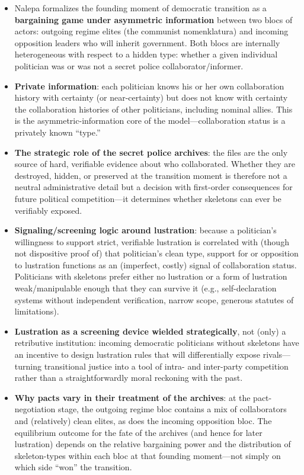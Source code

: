 \documentclass[12pt]{article}
\begin{document}
\begin{itemize}[leftmargin=*, itemsep=4pt]
    \item Nalepa formalizes the founding moment of democratic transition as a \textbf{bargaining game under asymmetric information} between two blocs of actors: outgoing regime elites (the communist nomenklatura) and incoming opposition leaders who will inherit government. Both blocs are internally heterogeneous with respect to a hidden type: whether a given individual politician was or was not a secret police collaborator/informer.
    \item \textbf{Private information}: each politician knows his or her own collaboration history with certainty (or near-certainty) but does not know with certainty the collaboration histories of other politicians, including nominal allies. This is the asymmetric-information core of the model---collaboration status is a privately known ``type.''
    \item \textbf{The strategic role of the secret police archives}: the files are the only source of hard, verifiable evidence about who collaborated. Whether they are destroyed, hidden, or preserved at the transition moment is therefore not a neutral administrative detail but a decision with first-order consequences for future political competition---it determines whether skeletons can ever be verifiably exposed.
    \item \textbf{Signaling/screening logic around lustration}: because a politician's willingness to support strict, verifiable lustration is correlated with (though not dispositive proof of) that politician's clean type, support for or opposition to lustration functions as an (imperfect, costly) signal of collaboration status. Politicians with skeletons prefer either no lustration or a form of lustration weak/manipulable enough that they can survive it (e.g., self-declaration systems without independent verification, narrow scope, generous statutes of limitations).
    \item \textbf{Lustration as a screening device wielded strategically}, not (only) a retributive institution: incoming democratic politicians without skeletons have an incentive to design lustration rules that will differentially expose rivals--- turning transitional justice into a tool of intra- and inter-party competition rather than a straightforwardly moral reckoning with the past.
    \item \textbf{Why pacts vary in their treatment of the archives}: at the pact-negotiation stage, the outgoing regime bloc contains a mix of collaborators and (relatively) clean elites, as does the incoming opposition bloc. The equilibrium outcome for the fate of the archives (and hence for later lustration) depends on the relative bargaining power and the distribution of skeleton-types within each bloc at that founding moment---not simply on which side ``won'' the transition.

\end{itemize}
\end{document}
